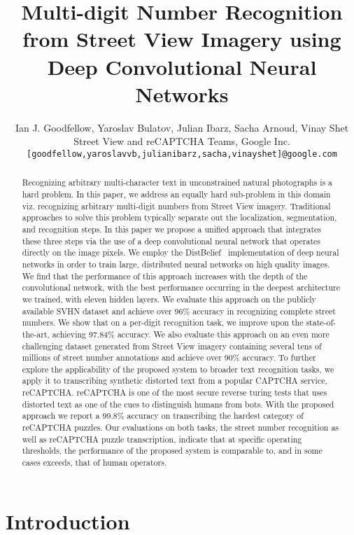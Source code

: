 \documentclass{article} \usepackage{comment}
\title{Multi-digit Number Recognition from Street View Imagery using Deep Convolutional Neural Networks}
\author{
Ian J. Goodfellow, Yaroslav Bulatov, Julian Ibarz, Sacha Arnoud, Vinay Shet\\
Street View and reCAPTCHA Teams, Google Inc.\\
\texttt{[goodfellow,yaroslavvb,julianibarz,sacha,vinayshet]@google.com} \\
}
\begin{document}
\maketitle

\begin{abstract}
Recognizing arbitrary multi-character text in unconstrained natural photographs is a hard problem. In this paper, we address an equally hard sub-problem in this domain viz. recognizing arbitrary multi-digit numbers from Street View imagery. Traditional approaches to solve this problem typically separate out the localization, segmentation, and recognition steps. In this paper we propose a unified approach that integrates these three steps via the use of a deep convolutional neural network that operates directly on the image pixels. We employ the DistBelief~\citep{Dean-et-al-NIPS2012} implementation of deep neural networks in order to train large, distributed neural networks on high quality images. We find that the performance of this approach increases with the depth of the convolutional network, with the best performance occurring in the deepest architecture we trained, with eleven hidden layers. We evaluate this approach on the publicly available SVHN dataset and achieve over 96\% accuracy in recognizing complete street numbers. We show that on a per-digit recognition task, we improve upon the state-of-the-art, achieving 97.84\% accuracy. We also evaluate this approach on an even more challenging dataset generated from Street View imagery containing several tens of millions of street number annotations and achieve over 90\% accuracy. To further explore the applicability of the proposed system to broader text recognition tasks, we apply it to transcribing synthetic distorted text from a popular CAPTCHA service, reCAPTCHA. reCAPTCHA is one of the most secure reverse turing tests that uses distorted text as one of the cues to distinguish humans from bots. With the proposed approach we report a 99.8\% accuracy on transcribing the hardest category of reCAPTCHA puzzles. Our evaluations on both tasks, the street number recognition as well as reCAPTCHA puzzle transcription, indicate that at specific operating thresholds, the performance of the proposed system is comparable to, and in some cases exceeds, that of human operators. 
\end{abstract}

\section{Introduction}
\end{document}
